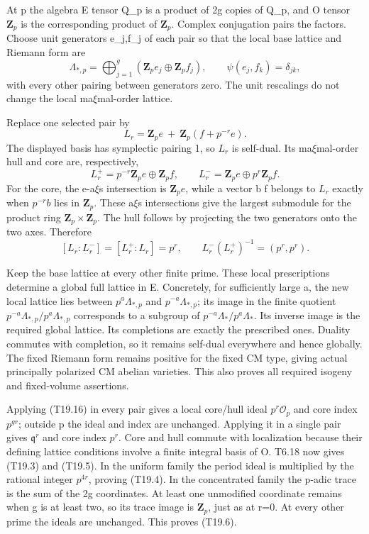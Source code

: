 At p the algebra E tensor Q\_p is a product of 2g copies of Q\_p, and O tensor \(\mathbf Z_p\) is the corresponding product of \(\mathbf Z_p\). Complex conjugation pairs the factors. Choose unit generators e\_j,f\_j of each pair so that the local base lattice and Riemann form are \[
 \Lambda_{*,p}=\bigoplus_{j=1}^g(\mathbf Z_p e_j\oplus\mathbf Z_p f_j),
 \qquad \psi(e_j,f_k)=\delta_{jk},
\] with every other pairing between generators zero. The unit rescalings do not change the local ma\(\xi\)mal-order lattice.

Replace one selected pair by \[
 L_r=\mathbf Z_p e\ +\ \mathbf Z_p(f+p^{-r}e).
 \tag{T19.14}
\] The displayed basis has symplectic pairing 1, so \(L_r\) is self-dual. Its ma\(\xi\)mal-order hull and core are, respectively, \[
 L_r^+=p^{-r}\mathbf Z_p e\oplus\mathbf Z_p f,
 \qquad
 L_r^-=\mathbf Z_p e\oplus p^r\mathbf Z_p f.
 \tag{T19.15}
\] For the core, the e-a\(\xi\)s intersection is \(\mathbf Z_p e\), while a vector b f belongs to \(L_r\) exactly when \(p^{-r}b\) lies in \(\mathbf Z_p\). These a\(\xi\)s intersections give the largest submodule for the product ring \(\mathbf Z_p\times\mathbf Z_p\). The hull follows by projecting the two generators onto the two axes. Therefore \[
 [L_r:L_r^-]=[L_r^+:L_r]=p^r,
 \qquad L_r^-(L_r^+)^{-1}=(p^r,p^r).
 \tag{T19.16}
\]

Keep the base lattice at every other finite prime. These local prescriptions determine a global full lattice in E. Concretely, for sufficiently large a, the new local lattice lies between \(p^a\Lambda_{*,p}\) and \(p^{-a}\Lambda_{*,p}\); its image in the finite quotient \(p^{-a}\Lambda_{*,p}/p^a\Lambda_{*,p}\) corresponds to a subgroup of \(p^{-a}\Lambda_*/p^a\Lambda_*\). Its inverse image is the required global lattice. Its completions are exactly the prescribed ones. Duality commutes with completion, so it remains self-dual everywhere and hence globally. The fixed Riemann form remains positive for the fixed CM type, giving actual principally polarized CM abelian varieties. This also proves all required isogeny and fixed-volume assertions.

Applying (T19.16) in every pair gives a local core/hull ideal \(p^r\mathcal O_p\) and core index \(p^{gr}\); outside p the ideal and index are unchanged. Applying it in a single pair gives \(\mathfrak q^r\) and core index \(p^r\). Core and hull commute with localization because their defining lattice conditions involve a finite integral basis of O. T6.18 now gives (T19.3) and (T19.5). In the uniform family the period ideal is multiplied by the rational integer \(p^{4r}\), proving (T19.4). In the concentrated family the p-adic trace is the sum of the 2g coordinates. At least one unmodified coordinate remains when g is at least two, so its trace image is \(\mathbf Z_p\), just as at r=0. At every other prime the ideals are unchanged. This proves (T19.6).

